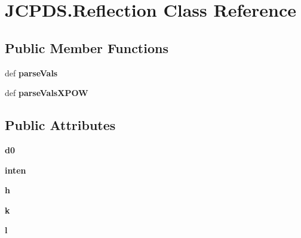\hypertarget{classJCPDS_1_1Reflection}{\section{J\-C\-P\-D\-S.\-Reflection Class Reference}
\label{classJCPDS_1_1Reflection}
}
\subsection*{Public Member Functions}
\begin{DoxyCompactItemize}
\item 
\hypertarget{classJCPDS_1_1Reflection_a60f239e7b0dc01ae22859aab4ce15958}{def {\bfseries parse\-Vals}}\label{classJCPDS_1_1Reflection_a60f239e7b0dc01ae22859aab4ce15958}

\item 
\hypertarget{classJCPDS_1_1Reflection_a5b0c369390f0f6c9d4f43f79451666ad}{def {\bfseries parse\-Vals\-X\-P\-O\-W}}\label{classJCPDS_1_1Reflection_a5b0c369390f0f6c9d4f43f79451666ad}

\end{DoxyCompactItemize}
\subsection*{Public Attributes}
\begin{DoxyCompactItemize}
\item 
\hypertarget{classJCPDS_1_1Reflection_a2e19b84f40e3e5dadbe49a60cd45406e}{{\bfseries d0}}\label{classJCPDS_1_1Reflection_a2e19b84f40e3e5dadbe49a60cd45406e}

\item 
\hypertarget{classJCPDS_1_1Reflection_af4298638f38bd63f0731ee0d564f390d}{{\bfseries inten}}\label{classJCPDS_1_1Reflection_af4298638f38bd63f0731ee0d564f390d}

\item 
\hypertarget{classJCPDS_1_1Reflection_aaab66547bee474122bb66caa9732b683}{{\bfseries h}}\label{classJCPDS_1_1Reflection_aaab66547bee474122bb66caa9732b683}

\item 
\hypertarget{classJCPDS_1_1Reflection_a40102fb28adbda5bc337211845a3a3e3}{{\bfseries k}}\label{classJCPDS_1_1Reflection_a40102fb28adbda5bc337211845a3a3e3}

\item 
\hypertarget{classJCPDS_1_1Reflection_a678d14a1fe67331931242cc73ef096b9}{{\bfseries l}}\label{classJCPDS_1_1Reflection_a678d14a1fe67331931242cc73ef096b9}

\end{DoxyCompactItemize}
